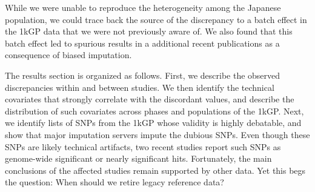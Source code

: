 \documentclass[9pt,lineno]{elife}
\begin{document}
While we were unable to reproduce the heterogeneity among the Japanese population, we could trace back the source of the discrepancy to a batch effect in the 1kGP data that we were not previously aware of.
We also found that this batch effect led to spurious results in a additional recent publications as a consequence of biased imputation. 

The results section is organized as follows.
First, we describe the observed discrepancies within and between studies. We then identify the technical covariates that strongly correlate with the discordant values, and describe the distribution of such covariates across phases and populations of the 1kGP.    
Next, we identify lists of SNPs from the 1kGP whose validity is highly debatable, and show that major imputation servers impute the dubious SNPs.  
Even though these SNPs are likely technical artifacts, two recent studies report such SNPs as genome-wide significant or nearly significant hits.   
Fortunately, the main conclusions of the affected studies remain supported by other data. 
Yet this begs the question: When should we retire legacy reference data?
\end{document}
